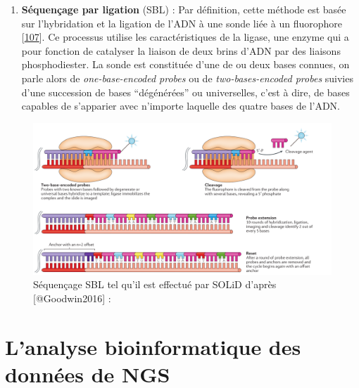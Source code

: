 \documentclass[12pt,twoside]{ugathesis}
\providecommand{\tightlist}{%
  \setlength{\itemsep}{0pt}\setlength{\parskip}{0pt}}
\theoremstyle{definition}
\theoremstyle{definition}
\theoremstyle{remark}
\begin{document}
\newpage

\begin{enumerate}
\def\labelenumi{\arabic{enumi}.}
\setcounter{enumi}{1}
\tightlist
\item
  \textbf{Séquençage par ligation} (SBL) : Par définition, cette méthode
  est basée sur l'hybridation et la ligation de l'ADN à une sonde liée à
  un fluorophore {[}\protect\hyperlink{ref-Tomkinson2006}{107}{]}. Ce
  processus utilise les caractéristiques de la ligase, une enzyme qui a
  pour fonction de catalyser la liaison de deux brins d'ADN par des
  liaisons phosphodiester. La sonde est constituée d'une de ou deux
  bases connues, on parle alors de \emph{one-base-encoded probes} ou de
  \emph{two-bases-encoded probes} suivies d'une succession de bases
  ``dégénérées'' ou universelles, c'est à dire, de bases capables de
  s'apparier avec n'importe laquelle des quatre bases de l'ADN.
\end{enumerate}

\begin{figure}

{\centering \includegraphics[scale=.26]{figure/SBL_seq_solid} 

}

\caption[Séquençage SBL tel qu'il est effectué par SOLiD]{Séquençage SBL tel qu'il est effectué par SOLiD d'après [@Goodwin2016] : }\label{fig:sblSeq}
\end{figure}

\newpage  

\section{L'analyse bioinformatique des données de
NGS}\label{lanalyse-bioinformatique-des-donnees-de-ngs}
\end{document}
